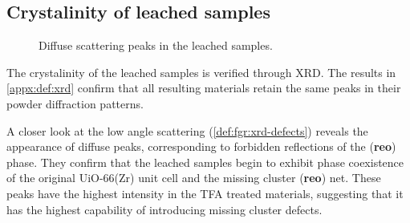 
\subsection{Crystalinity of leached samples}\label{def:xrd}

\begin{wrapfigure}[15]{R}{0.3\textwidth}
    \centering
    \captionsetup{format=plain}
    \caption{Diffuse scattering peaks in the  leached 
    samples.}%
    \label{def:fgr:xrd-defects}
\end{wrapfigure}

The crystalinity of the leached samples is verified through 
XRD. The results in \autoref{appx:def:xrd} confirm that all 
resulting materials retain the same peaks in their powder
diffraction patterns.

A closer look at the low angle scattering (\autoref{def:fgr:xrd-defects})
reveals the appearance of diffuse peaks, corresponding to forbidden
reflections of the (\textbf{reo}) phase. They confirm that the 
leached samples begin to exhibit phase coexistence of 
the original UiO-66(Zr) unit cell and the missing cluster
(\textbf{reo}) net. These peaks have the highest intensity in 
the TFA treated materials, suggesting that it has the highest 
capability of introducing missing cluster defects.